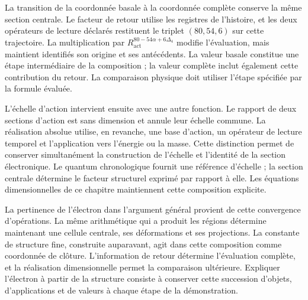 La transition de la coordonnée basale à la coordonnée complète conserve
la même section centrale. Le facteur de retour utilise les registres
de l'histoire, et les deux opérateurs de lecture déclarés restituent le triplet
$(80,54,6)$ sur cette trajectoire. La multiplication par
$R_{\mathrm{act}}^{80-54\alpha+6\Delta_4}$ modifie l'évaluation,
mais maintient identifiés son origine et ses antécédents. La valeur
basale constitue une étape intermédiaire de la composition ; la valeur
complète inclut également cette contribution du retour. La comparaison
physique doit utiliser l'étape spécifiée par la formule évaluée.

L'échelle d'action intervient ensuite avec une autre fonction. Le rapport de
deux sections d'action est sans dimension et annule leur échelle commune.
La réalisation absolue utilise, en revanche, une base d'action, un
opérateur de lecture temporel et l'application vers l'énergie ou la masse. Cette distinction permet
de conserver simultanément la construction de l'échelle et l'identité
de la section électronique. Le quantum chronologique fournit une
référence d'échelle ; la section centrale détermine le facteur structurel
exprimé par rapport à elle. Les équations dimensionnelles de ce
chapitre maintiennent cette composition explicite.

La pertinence de l'électron dans l'argument général provient de cette
convergence d'opérations. La même arithmétique qui a produit les
régions détermine maintenant une cellule centrale, ses déformations et ses
projections. La constante de structure fine, construite auparavant, agit
dans cette composition comme coordonnée de clôture. L'information de
retour détermine l'évaluation complète, et la réalisation dimensionnelle
permet la comparaison ultérieure. Expliquer l'électron à partir de la structure
consiste à conserver cette succession d'objets, d'applications et de valeurs à chaque
étape de la démonstration.
